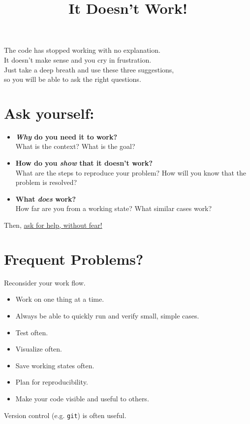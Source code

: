 \documentclass{article}
\title{\textbf{It Doesn't Work!}}
\date{}
\author{}
\begin{document}
\maketitle
\vspace{-50pt}

\begin{center}
The code has stopped working with no explanation.\\
It doesn't make sense and you cry in frustration.\\
Just take a deep breath and use these three suggestions,\\
so you will be able to ask the right questions.\\
\end{center}

\section*{Ask yourself:}
\begin{itemize}
\item \textbf{\emph{Why} do you need it to work?}\\
What is the context?
What is the goal?

\item \textbf{How do you \emph{show} that it doesn't work?}\\
What are the steps to reproduce your problem?
How will you know that the problem is resolved?

\item \textbf{What \emph{does} work?}\\
How far are you from a working state?
What similar cases work?
\end{itemize}

Then, \underline{ask for help, without fear!}

\vspace{10pt}

\section*{Frequent Problems?}
Reconsider your work flow.
\begin{itemize}
\item Work on one thing at a time.
\item Always be able to quickly run and verify small, simple cases.
\item Test often.
\item Visualize often.
\item Save working states often.
\item Plan for reproducibility.
\item Make your code visible and useful to others.
\end{itemize}
Version control (e.g. \texttt{git}) is often useful.
\end{document}
